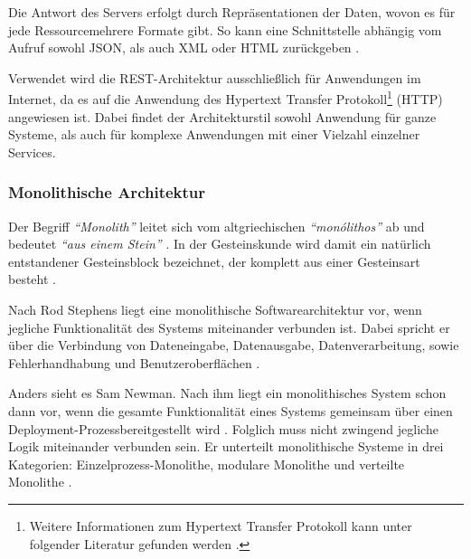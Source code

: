 Die Antwort des Servers erfolgt durch Repräsentationen der Daten, wovon es für jede Ressource\footnotemark mehrere Formate gibt. So kann eine Schnittstelle abhängig vom Aufruf sowohl JSON, als auch XML oder HTML zurückgeben \parencite[vgl.][S. 128]{starke_effektive_2015}.

Verwendet wird die REST-Architektur ausschließlich für Anwendungen im Internet, da es auf die Anwendung des Hypertext Transfer Protokoll\footnote{Weitere Informationen zum Hypertext Transfer Protokoll kann unter folgender Literatur gefunden werden \parencite{leach_hypertext_2020}.} (HTTP) angewiesen ist. Dabei findet der Architekturstil sowohl Anwendung für ganze Systeme, als auch für komplexe Anwendungen mit einer Vielzahl einzelner Services.

\subsubsection{Monolithische Architektur}
\label{sec:monolith}

Der Begriff \textit{\enquote{Monolith}} leitet sich vom altgriechischen \textit{\enquote{monólithos}} ab und bedeutet \textit{\enquote{aus einem Stein}} \parencites[vgl.][]{duden_nodate}[vgl.][]{dwds_nodate}. In der Gesteinskunde wird damit ein natürlich entstandener Gesteinsblock bezeichnet, der komplett aus einer Gesteinsart besteht \parencite[vgl.][]{dwds_nodate}.

Nach Rod Stephens liegt eine monolithische Softwarearchitektur vor, wenn jegliche Funktionalität des Systems miteinander verbunden ist. Dabei spricht er über die Verbindung von Dateneingabe, Datenausgabe, Datenverarbeitung, sowie Fehlerhandhabung und Benutzeroberflächen \parencite[vgl.][S. 94]{stephens_beginning_2015}.

Anders sieht es Sam Newman. Nach ihm liegt ein monolithisches System schon dann vor, wenn die gesamte Funktionalität eines Systems gemeinsam über einen Deployment-Prozess\footnotemark bereitgestellt wird \parencite[vgl.][Kap. 2.2]{newman_monolith_2019}. Folglich muss nicht zwingend jegliche Logik miteinander verbunden sein. Er unterteilt monolithische Systeme in drei Kategorien: Einzelprozess-Monolithe, modulare Monolithe und verteilte Monolithe \parencite[vgl.][Kap. 2.2]{newman_monolith_2019}.

